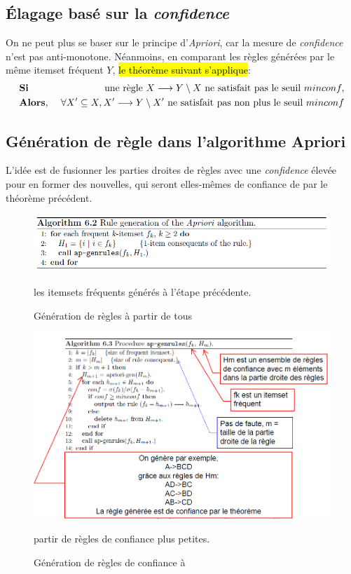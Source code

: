 \documentclass[letterpaper, 12pt]{article}
\newcommand{\alinea}{
\hspace*{0.5cm}}
\begin{document}
		\subsection{\'Elagage basé sur la \textit{confidence}}
			\alinea On ne peut plus se baser sur le principe 	
				d'\textit{Apriori}, car la mesure de \textit{confidence} 
				n'est pas anti-monotone. Néanmoins, en comparant les règles 
				générées par le même itemset fréquent $Y$, \hl{le théorème
				suivant	s'applique}:
				\begin{align*}
				   &\text{\textbf{Si}}\ &\text{une règle } X\longrightarrow Y
				   			\setminus X 
					\text{ ne satisfait pas le seuil } minconf, \\
					&\text{\textbf{Alors}},\ &\forall X' \subseteq X, 
					  X' \longrightarrow Y \setminus X' \text{ ne 
					  satisfait pas non plus le seuil } minconf
				\end{align*}
		\subsection{Génération de règle dans l'algorithme Apriori}
			\alinea L'idée est de fusionner les parties droites de
				règles avec une \textit{confidence} élevée pour en former
				des nouvelles, qui seront elles-mêmes de confiance de par
				le théorème précédent.
			\begin{figure}[H]
				\centering
				\includegraphics[scale=0.75]{Images/conf_algo1}
				\caption{Génération de règles à partir de tous}
				les itemsets fréquents générés à l'étape précédente.
				\label{fig:conf:algo1}
			\end{figure}\noindent
			\begin{figure}[H]
				\centering
				\includegraphics[scale=0.75]{Images/conf_algo2}
				\caption{Génération de règles de confiance à}
				partir de règles de confiance plus petites.
				\label{fig:conf:algo2}
			\end{figure}\noindent
	\newpage
\end{document}
